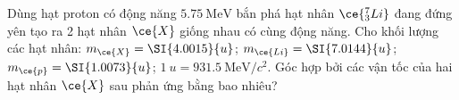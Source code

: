 \begin{ex}
	Dùng hạt proton có động năng $\SI{5.75}{\mega\electronvolt}$ bắn phá hạt nhân $\ce{^7_3Li}$ đang đứng yên tạo ra 2 hạt nhân $\ce{X}$ giống nhau có cùng động năng. Cho khối lượng các hạt nhân: $m_{\ce{X}}=\SI{4.0015}{u}$; $m_{\ce{Li}}=\SI{7.0144}{u}$; $m_{\ce{p}}=\SI{1.0073}{u}$; $\SI{1}{u}=\SI{931.5}{\mega\electronvolt/c^2}$. Góc hợp bởi các vận tốc của hai hạt nhân $\ce{X}$ sau phản ứng bằng bao nhiêu?
\end{ex}
